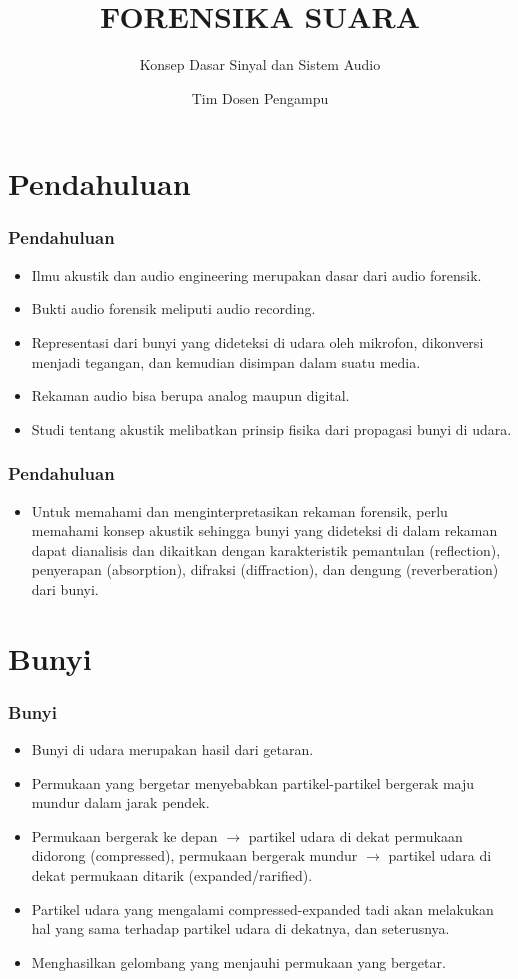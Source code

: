 \documentclass[pdflatex,compress]{beamer}
\title{FORENSIKA SUARA}
\subtitle{Konsep Dasar Sinyal dan Sistem Audio}
\author{Tim Dosen Pengampu}
\begin{document}
\maketitle

\section{Pendahuluan}

\begin{frame}
	\frametitle{Pendahuluan}
	\begin{itemize}
		\item Ilmu akustik dan audio engineering merupakan dasar dari audio forensik.
		\item Bukti audio forensik meliputi audio recording. \item Representasi dari bunyi yang dideteksi di udara oleh mikrofon, dikonversi menjadi tegangan, dan kemudian disimpan dalam suatu media.
		\item Rekaman audio bisa berupa analog maupun digital.
		\item Studi tentang akustik melibatkan prinsip fisika dari propagasi bunyi di udara.
	\end{itemize}
\end{frame}

\begin{frame}
	\frametitle{Pendahuluan}
	\begin{itemize}
		\item Untuk memahami dan menginterpretasikan rekaman forensik, perlu memahami konsep akustik sehingga bunyi yang dideteksi di dalam rekaman dapat dianalisis dan dikaitkan dengan karakteristik pemantulan (reflection), penyerapan (absorption), difraksi (diffraction), dan dengung (reverberation) dari bunyi.
	\end{itemize}
\end{frame}

\section{Bunyi}

\begin{frame}
	\frametitle{Bunyi}
	\begin{itemize}
		\item Bunyi di udara merupakan hasil dari getaran.
		\item Permukaan yang bergetar menyebabkan partikel-partikel bergerak maju mundur dalam jarak pendek.
		\item Permukaan bergerak ke depan $\rightarrow$ partikel udara di dekat permukaan didorong (compressed), permukaan bergerak mundur $\rightarrow$ partikel udara di dekat permukaan ditarik (expanded/rarified).
		\item Partikel udara yang mengalami compressed-expanded tadi akan melakukan hal yang sama terhadap partikel udara di dekatnya, dan seterusnya.
		\item Menghasilkan gelombang yang menjauhi permukaan yang bergetar.
	\end{itemize}
\end{frame}
\end{document}
